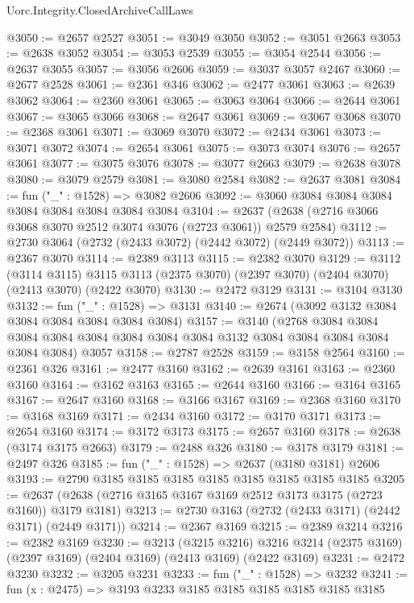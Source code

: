\begin{lexlean}{Uorc.Integrity.ClosedArchiveCallLaws}
\begin{coremodule}
@3050 := @2657 @2527
@3051 := @3049 @3050
@3052 := @3051 @2663
@3053 := @2638 @3052
@3054 := @3053 @2539
@3055 := @3054 @2544
@3056 := @2637 @3055
@3057 := @3056 @2606
@3059 := @3037 @3057 @2467
@3060 := @2677 @2528
@3061 := @2361 @346
@3062 := @2477 @3061
@3063 := @2639 @3062
@3064 := @2360 @3061
@3065 := @3063 @3064
@3066 := @2644 @3061
@3067 := @3065 @3066
@3068 := @2647 @3061
@3069 := @3067 @3068
@3070 := @2368 @3061
@3071 := @3069 @3070
@3072 := @2434 @3061
@3073 := @3071 @3072
@3074 := @2654 @3061
@3075 := @3073 @3074
@3076 := @2657 @3061
@3077 := @3075 @3076
@3078 := @3077 @2663
@3079 := @2638 @3078
@3080 := @3079 @2579
@3081 := @3080 @2584
@3082 := @2637 @3081
@3084 := fun ("_" : @1528) => @3082 @2606
@3092 := @3060 @3084 @3084 @3084 @3084 @3084 @3084 @3084 @3084
@3104 := @2637 (@2638 (@2716 @3066 @3068 @3070 @2512 @3074 @3076 (@2723 @3061)) @2579 @2584)
@3112 := @2730 @3064 (@2732 (@2433 @3072) (@2442 @3072) (@2449 @3072))
@3113 := @2367 @3070
@3114 := @2389 @3113
@3115 := @2382 @3070
@3129 := @3112
    (@3114 @3115)
    @3115
    @3113
    (@2375 @3070)
    (@2397 @3070)
    (@2404 @3070)
    (@2413 @3070)
    (@2422 @3070)
@3130 := @2472 @3129
@3131 := @3104 @3130
@3132 := fun ("_" : @1528) => @3131
@3140 := @2674 (@3092 @3132 @3084 @3084 @3084 @3084 @3084 @3084)
@3157 := @3140
    (@2768
      @3084
      @3084
      @3084
      @3084
      @3084
      @3084
      @3084
      @3084
      @3132
      @3084
      @3084
      @3084
      @3084
      @3084
      @3084)
    @3057
@3158 := @2787 @2528
@3159 := @3158 @2564
@3160 := @2361 @326
@3161 := @2477 @3160
@3162 := @2639 @3161
@3163 := @2360 @3160
@3164 := @3162 @3163
@3165 := @2644 @3160
@3166 := @3164 @3165
@3167 := @2647 @3160
@3168 := @3166 @3167
@3169 := @2368 @3160
@3170 := @3168 @3169
@3171 := @2434 @3160
@3172 := @3170 @3171
@3173 := @2654 @3160
@3174 := @3172 @3173
@3175 := @2657 @3160
@3178 := @2638 (@3174 @3175 @2663)
@3179 := @2488 @326
@3180 := @3178 @3179
@3181 := @2497 @326
@3185 := fun ("_" : @1528) => @2637 (@3180 @3181) @2606
@3193 := @2790 @3185 @3185 @3185 @3185 @3185 @3185 @3185 @3185
@3205 := @2637 (@2638 (@2716 @3165 @3167 @3169 @2512 @3173 @3175 (@2723 @3160)) @3179 @3181)
@3213 := @2730 @3163 (@2732 (@2433 @3171) (@2442 @3171) (@2449 @3171))
@3214 := @2367 @3169
@3215 := @2389 @3214
@3216 := @2382 @3169
@3230 := @3213
    (@3215 @3216)
    @3216
    @3214
    (@2375 @3169)
    (@2397 @3169)
    (@2404 @3169)
    (@2413 @3169)
    (@2422 @3169)
@3231 := @2472 @3230
@3232 := @3205 @3231
@3233 := fun ("_" : @1528) => @3232
@3241 := fun (x : @2475) => @3193 @3233 @3185 @3185 @3185 @3185 @3185 @3185

\end{coremodule}
\end{lexlean}
